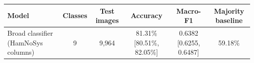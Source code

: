 \begin{tabular}{lccccc}
\toprule
\textbf{Model} & \textbf{Classes} & \textbf{Test images} & \textbf{Accuracy} & \textbf{Macro-F1} & \textbf{Majority baseline} \\
\midrule
Broad classifier (HamNoSys columns) & 9 & 9,964 & 81.31\% [80.51\%, 82.05\%] & 0.6382 [0.6255, 0.6487] & 59.18\% \\
\bottomrule
\end{tabular}
